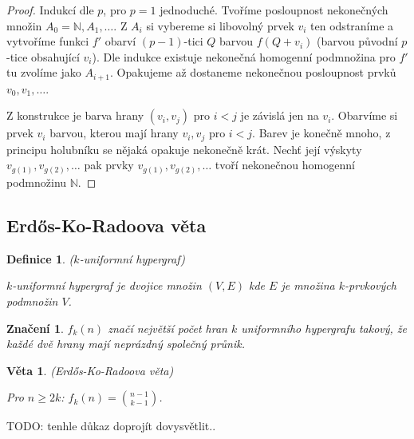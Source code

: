 \documentclass[a4paper,10pt,titlepage]{article} \usepackage[utf8]{inputenc}
\newtheorem{theorem}{Věta}
\newtheorem{define}{Definice}
\newtheorem*{notation}{Značení}
\begin{document}
\begin{proof}
Indukcí dle $p$, pro $p=1$ jednoduché.
Tvoříme posloupnost nekonečných množin $A_0 = \mathbb{N},A_1, \ldots $.
Z $A_i$ si vybereme si libovolný prvek $v_i$ ten odstraníme a vytvoříme funkci $f'$ obarví $(p-1)$-tici $Q$ barvou $f(Q+v_i)$
(barvou původní $p$-tice obsahující $v_i$).
Dle indukce existuje nekonečná homogenní podmnožina pro $f'$ tu zvolíme jako $A_{i+1}$.
Opakujeme až dostaneme nekonečnou posloupnost prvků $v_0,v_1, \ldots $.
 
Z konstrukce je barva hrany $(v_i, v_j)$ pro $i<j$ je závislá jen na $v_i$.
Obarvíme si prvek $v_i$ barvou, kterou mají hrany $v_i,v_j$ pro $i<j$.
Barev je konečně mnoho, z principu holubníku se nějaká opakuje nekonečně krát.
Nechť její výskyty $v_{g(1)},v_{g(2)}, \ldots$ pak prvky $v_{g(1)},v_{g(2)}, \ldots$
tvoří nekonečnou homogenní podmnožinu $\mathbb{N}$.
\end{proof}

\subsection{Erd\H{o}s-Ko-Radoova věta}

\begin{define}
($k$-uniformní hypergraf)

$k$-uniformní hypergraf je dvojice množin $(V,E)$ kde $E$ je množina $k$-prvkových podmnožin $V$.
\end{define}

\begin{notation}
$f_k(n)$ značí největší počet hran $k$ uniformního hypergrafu takový, že každé dvě hrany mají neprázdný společný průnik.
\end{notation}

\begin{theorem}
(Erd\H{o}s-Ko-Radoova věta)

Pro $n\geq 2k$: $f_k(n) = \binom{n-1}{k-1}$.
\end{theorem}

TODO: tenhle důkaz doprojít dovysvětlit..
\end{document}
